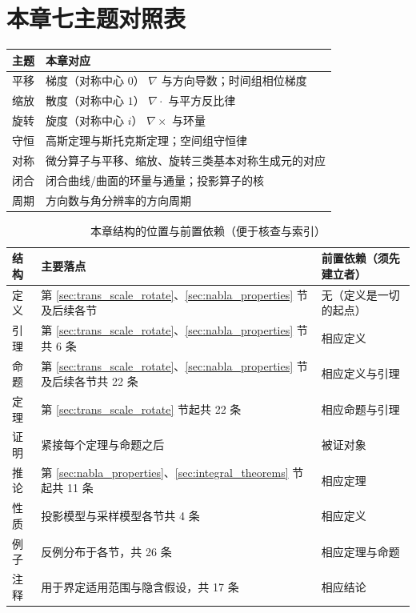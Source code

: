 \section*{本章七主题对照表}

\begin{center}
\renewcommand{\arraystretch}{1.3}
\begin{tabular}{>{\centering\arraybackslash}p{2.2cm}>{\centering\arraybackslash}p{11cm}}
\toprule
主题 & 本章对应 \\
\midrule
平移 & 梯度（对称中心 $0$） $\nabla$ 与方向导数；时间组相位梯度 \\
缩放 & 散度（对称中心 $1$） $\nabla\cdot$ 与平方反比律 \\
旋转 & 旋度（对称中心 $i$） $\nabla\times$ 与环量 \\
守恒 & 高斯定理与斯托克斯定理；空间组守恒律 \\
对称 & 微分算子与平移、缩放、旋转三类基本对称生成元的对应 \\
闭合 & 闭合曲线/曲面的环量与通量；投影算子的核 \\
周期 & 方向数与角分辨率的方向周期 \\
\bottomrule
\end{tabular}
\end{center}
\begin{table}[htbp]
    \centering
    \caption{本章结构的位置与前置依赖（便于核查与索引）}
    \label{tab:chapter_structure_map}
    \renewcommand{\arraystretch}{1.2}
    \footnotesize
    \setlength{\tabcolsep}{4pt}
    \begin{tabular}{@{}l >{\raggedright\arraybackslash}p{3.1cm} >{\raggedright\arraybackslash}p{10.3cm}@{}}
        \toprule
        \textbf{结构} & \textbf{主要落点} & \textbf{前置依赖（须先建立者）} \\
        \midrule
        定义 & 第 \ref{sec:trans_scale_rotate}、\ref{sec:nabla_properties} 节及后续各节 & 无（定义是一切的起点）\\
        引理 & 第 \ref{sec:trans_scale_rotate}、\ref{sec:nabla_properties} 节共 6 条 & 相应定义\\
        命题 & 第 \ref{sec:trans_scale_rotate}、\ref{sec:nabla_properties} 节及后续各节共 22 条 & 相应定义与引理\\
        定理 & 第 \ref{sec:trans_scale_rotate} 节起共 22 条 & 相应命题与引理\\
        证明 & 紧接每个定理与命题之后 & 被证对象\\
        推论 & 第 \ref{sec:nabla_properties}、\ref{sec:integral_theorems} 节起共 11 条 & 相应定理\\
        性质 & 投影模型与采样模型各节共 4 条 & 相应定义\\
        例子 & 反例分布于各节，共 26 条 & 相应定理与命题\\
        注释 & 用于界定适用范围与隐含假设，共 17 条 & 相应结论\\
        \bottomrule
    \end{tabular}
\end{table}

